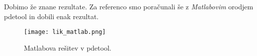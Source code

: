 \documentclass[12pt,a4paper]{article}
\begin{document}
\noindent Dobimo že znane rezultate. Za referenco smo poračunali še z \textit{Matlabovim} orodjem \textsf{pdetool} in dobili enak rezultat.

\begin{figure}[H]
\begin{center}
\texttt{[image: lik\_matlab.png]}
\caption{Matlabova rešitev v \textsf{pdetool}.} \label{fig:slika14}
\end{center}
\end{figure}
\end{document}
